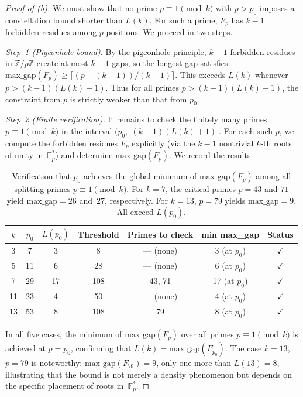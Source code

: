\documentclass[11pt,a4paper]{article}
\newcommand{\Fpstar}{\mathbb{F}_p^*}
\newcommand{\ZZ}{\mathbb{Z}}
\begin{document}
\begin{proof}[Proof of \textup{(b)}]
We must show that no prime $p \equiv 1 \pmod{k}$ with $p > p_0$ imposes a constellation bound shorter than $L(k)$. For such a prime, $F_p$ has $k-1$ forbidden residues among $p$ positions. We proceed in two steps.

\emph{Step~1 (Pigeonhole bound).}
By the pigeonhole principle, $k-1$ forbidden residues in $\ZZ/p\ZZ$ create at most $k-1$ gaps, so the longest gap satisfies $\mathrm{max\_gap}(F_p) \ge \lceil(p - (k-1))/(k-1)\rceil$. This exceeds $L(k)$ whenever $p > (k-1)(L(k)+1)$. Thus for all primes $p > (k-1)(L(k)+1)$, the constraint from $p$ is strictly weaker than that from $p_0$.

\emph{Step~2 (Finite verification).}
It remains to check the finitely many primes $p \equiv 1 \pmod{k}$ in the interval $(p_0,\; (k-1)(L(k)+1)]$. For each such $p$, we compute the forbidden residues $F_p$ explicitly (via the $k-1$ nontrivial $k$-th roots of unity in~$\Fpstar$) and determine $\mathrm{max\_gap}(F_p)$. We record the results:

\begin{table}[ht]
\centering
\caption{Verification that $p_0$ achieves the global minimum of $\mathrm{max\_gap}(F_p)$ among all splitting primes $p \equiv 1 \pmod{k}$. For $k=7$, the critical primes $p=43$ and $71$ yield $\mathrm{max\_gap} = 26$ and~$27$, respectively. For $k=13$, $p=79$ yields $\mathrm{max\_gap} = 9$. All exceed $L(p_0)$.}\label{tab:gapverify}
\smallskip
\begin{tabular}{ccccccc}
\toprule
$k$ & $p_0$ & $L(p_0)$ & Threshold & Primes to check & min max\_gap & Status \\
\midrule
3  & 7  & 3  & 8   & --- (none) & 3 (at $p_0$) & $\checkmark$ \\
5  & 11 & 6  & 28  & --- (none) & 6 (at $p_0$) & $\checkmark$ \\
7  & 29 & 17 & 108 & 43, 71     & 17 (at $p_0$) & $\checkmark$ \\
11 & 23 & 4  & 50  & --- (none) & 4 (at $p_0$) & $\checkmark$ \\
13 & 53 & 8  & 108 & 79         & 8 (at $p_0$) & $\checkmark$ \\
\bottomrule
\end{tabular}
\end{table}

In all five cases, the minimum of $\mathrm{max\_gap}(F_p)$ over all primes $p \equiv 1 \pmod{k}$ is achieved at $p = p_0$, confirming that $L(k) = \mathrm{max\_gap}(F_{p_0})$. The case $k = 13$, $p = 79$ is noteworthy: $\mathrm{max\_gap}(F_{79}) = 9$, only one more than $L(13) = 8$, illustrating that the bound is not merely a density phenomenon but depends on the specific placement of roots in~$\Fpstar$.


\end{proof}
\end{document}
